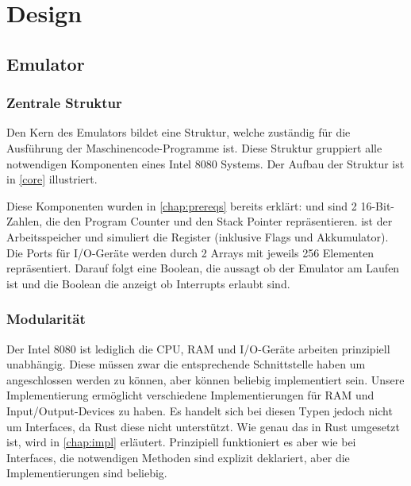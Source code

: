 \chapter{Design}\label{chap:design}

\section{Emulator}

\subsection{Zentrale Struktur}

Den Kern des Emulators bildet eine Struktur, welche zuständig für die Ausführung der Maschinencode-Programme ist. Diese Struktur gruppiert alle notwendigen Komponenten eines Intel 8080 Systems. Der Aufbau der Struktur ist in \cref{core} illustriert.

Diese Komponenten wurden in \cref{chap:prereqs} bereits erklärt:  und  sind 2 16-Bit-Zahlen, die den Program Counter und den Stack Pointer repräsentieren.  ist der Arbeitsspeicher und  simuliert die Register (inklusive Flags und Akkumulator).
Die Ports für I/O-Geräte werden durch 2 Arrays mit jeweils 256 Elementen repräsentiert.
Darauf folgt eine Boolean, die aussagt ob der Emulator am Laufen ist und die Boolean die anzeigt ob Interrupts erlaubt sind.


\subsection{Modularität}

Der Intel 8080 ist lediglich die CPU, RAM und I/O-Geräte arbeiten prinzipiell unabhängig. Diese müssen zwar die entsprechende Schnittstelle haben um angeschlossen werden zu können, aber können beliebig implementiert sein. Unsere Implementierung ermöglicht verschiedene Implementierungen für RAM und Input/Output-Devices zu haben. Es handelt sich bei diesen Typen jedoch nicht um Interfaces, da Rust diese nicht unterstützt. Wie genau das in Rust umgesetzt ist, wird in \cref{chap:impl} erläutert. Prinzipiell funktioniert es aber wie bei Interfaces, die notwendigen Methoden sind explizit deklariert, aber die Implementierungen sind beliebig.

